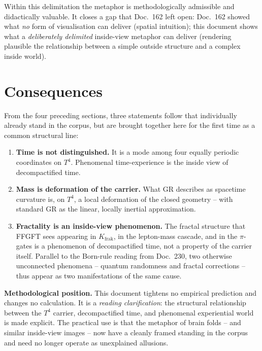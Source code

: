 Within this delimitation the metaphor is methodologically admissible
and didactically valuable. It closes a gap that Doc.~162 left open:
Doc.~162 showed what \emph{no} form of visualisation can deliver
(spatial intuition); this document shows what a \emph{deliberately
delimited} inside-view metaphor can deliver (rendering plausible the
relationship between a simple outside structure and a complex
inside world).

\section{Consequences}

From the four preceding sections, three statements follow that
individually already stand in the corpus, but are brought together
here for the first time as a common structural line:

\begin{enumerate}[leftmargin=2em,itemsep=4pt,topsep=4pt]
  \item \textbf{Time is not distinguished.} It is a mode among four
        equally periodic coordinates on $T^4$. Phenomenal
        time-experience is the inside view of decompactified time.

  \item \textbf{Mass is deformation of the carrier.} What GR
        describes as spacetime curvature is, on $T^4$, a local
        deformation of the closed geometry -- with standard GR as
        the linear, locally inertial approximation.

  \item \textbf{Fractality is an inside-view phenomenon.} The
        fractal structure that FFGFT sees appearing in
        $K_{\text{frak}}$, in the lepton-mass cascade, and in the
        $\pi$-gates is a phenomenon of decompactified time, not a
        property of the carrier itself. Parallel to the Born-rule
        reading from Doc.~230, two otherwise unconnected phenomena
        -- quantum randomness and fractal corrections -- thus
        appear as two manifestations of the same cause.
\end{enumerate}

\textbf{Methodological position.} This document tightens no
empirical prediction and changes no calculation. It is a
\emph{reading clarification}: the structural relationship between
the $T^4$ carrier, decompactified time, and phenomenal
experiential world is made explicit. The practical use is that the
metaphor of brain folds -- and similar inside-view images -- now
have a cleanly framed standing in the corpus and need no longer
operate as unexplained allusions.

